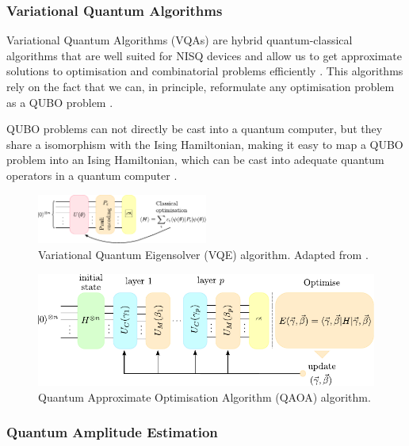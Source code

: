 \documentclass[prx,twocolumn,floatfix,superscriptaddress,longbibliography]{revtex4-1}
\begin{document}
\subsubsection{Variational Quantum Algorithms}

Variational Quantum Algorithms (VQAs) are hybrid quantum-classical algorithms that 
are well suited for NISQ devices and allow us to get approximate solutions to optimisation and combinatorial problems efficiently \cite{Cerezo2021}. This algorithms rely on the fact that we can, in 
principle, reformulate any optimisation problem as a QUBO problem \cite{Glover2019}.  

QUBO problems can not directly be cast into a quantum computer, but they share a isomorphism with the Ising Hamiltonian, making it easy to map a QUBO problem into an Ising Hamiltonian, which can be cast into adequate quantum operators in a quantum computer \cite{Buonaiuto2023}. 
\begin{figure}[h!]
\centering 
\includegraphics[width=0.5\textwidth]{VQE-Buonaiuto.pdf}
  \caption{\label{fig:vqe} Variational Quantum Eigensolver (VQE) algorithm. Adapted from \cite{Buonaiuto2023}.}
\end{figure}




\begin{figure}[ht!]
  \begin{center} 
  \includegraphics[width=\textwidth]{QAOA-Blekos.pdf}
  \caption{\label{fig:qaoa} Quantum Approximate Optimisation Algorithm (QAOA) algorithm.}
  \end{center}
\end{figure}

\subsubsection{Quantum Amplitude Estimation}
\end{document}
